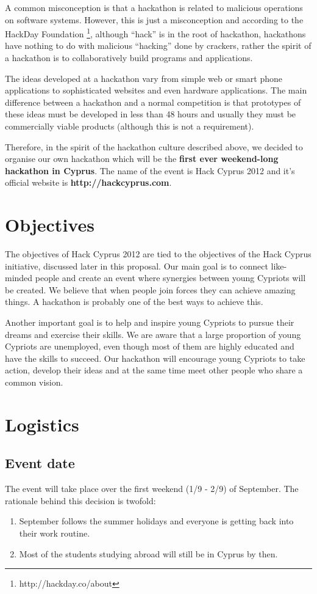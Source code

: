 \documentclass[a4paper,11pt]{report}
\begin{document}
A common misconception is that a hackathon is related to malicious operations on software systems. However, this is just a misconception and according to the HackDay Foundation \footnote{http://hackday.co/about}, although “hack” is in the root of hackathon, hackathons have nothing to do with malicious “hacking” done by crackers, rather the spirit of a hackathon is to collaboratively build programs and applications.

The ideas developed at a hackathon vary from simple web or smart phone applications to sophisticated websites and even hardware applications. The main difference between a hackathon and a normal competition is that prototypes of these ideas must be developed in less than 48 hours and usually they must be commercially viable products (although this is not a requirement).  

Therefore, in the spirit of the hackathon culture described above, we decided to organise our own hackathon which will be the \textbf{first ever weekend-long hackathon in Cyprus}. The name of the event is Hack Cyprus 2012 and it's official website is \textbf{http://hackcyprus.com}.

\section{Objectives}
The objectives of Hack Cyprus 2012 are tied to the objectives of the Hack Cyprus initiative, discussed later in this proposal. Our main goal is to connect like-minded people and create an event where synergies between young Cypriots will be created. We believe that when people join forces they can achieve amazing things. A hackathon is probably one of the best ways to achieve this. 

Another important goal is to help and inspire young Cypriots to pursue their dreams and exercise their skills. We are aware that a large proportion of young Cypriots are unemployed, even though most of them are highly educated and have the skills to succeed. Our hackathon will encourage young Cypriots to take action, develop their ideas and at the same time meet other people who share a common vision. 

\section{Logistics}
\subsection{Event date}
The event will take place over the first weekend (1/9 - 2/9) of September. The rationale behind this decision is twofold:
\begin{enumerate}
  \item September follows the summer holidays and everyone is getting back into their work routine.
  \item Most of the students studying abroad will still be in Cyprus by then.
\end{enumerate}
\end{document}

